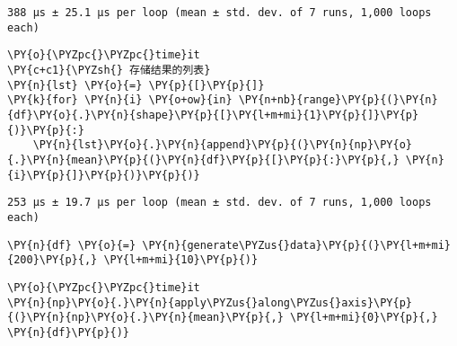     \begin{Verbatim}[commandchars=\\\{\}]
388 µs ± 25.1 µs per loop (mean ± std. dev. of 7 runs, 1,000 loops each)
    \end{Verbatim}

    \begin{tcolorbox}[breakable, size=fbox, boxrule=1pt, pad at break*=1mm,colback=cellbackground, colframe=cellborder]
\begin{Verbatim}[commandchars=\\\{\}]
\PY{o}{\PYZpc{}\PYZpc{}time}it
\PY{c+c1}{\PYZsh{} 存储结果的列表}
\PY{n}{lst} \PY{o}{=} \PY{p}{[}\PY{p}{]}
\PY{k}{for} \PY{n}{i} \PY{o+ow}{in} \PY{n+nb}{range}\PY{p}{(}\PY{n}{df}\PY{o}{.}\PY{n}{shape}\PY{p}{[}\PY{l+m+mi}{1}\PY{p}{]}\PY{p}{)}\PY{p}{:}
    \PY{n}{lst}\PY{o}{.}\PY{n}{append}\PY{p}{(}\PY{n}{np}\PY{o}{.}\PY{n}{mean}\PY{p}{(}\PY{n}{df}\PY{p}{[}\PY{p}{:}\PY{p}{,} \PY{n}{i}\PY{p}{]}\PY{p}{)}\PY{p}{)}
\end{Verbatim}
\end{tcolorbox}

    \begin{Verbatim}[commandchars=\\\{\}]
253 µs ± 19.7 µs per loop (mean ± std. dev. of 7 runs, 1,000 loops each)
    \end{Verbatim}

    \begin{tcolorbox}[breakable, size=fbox, boxrule=1pt, pad at break*=1mm,colback=cellbackground, colframe=cellborder]
\begin{Verbatim}[commandchars=\\\{\}]
\PY{n}{df} \PY{o}{=} \PY{n}{generate\PYZus{}data}\PY{p}{(}\PY{l+m+mi}{200}\PY{p}{,} \PY{l+m+mi}{10}\PY{p}{)}
\end{Verbatim}
\end{tcolorbox}

    \begin{tcolorbox}[breakable, size=fbox, boxrule=1pt, pad at break*=1mm,colback=cellbackground, colframe=cellborder]
\begin{Verbatim}[commandchars=\\\{\}]
\PY{o}{\PYZpc{}\PYZpc{}time}it
\PY{n}{np}\PY{o}{.}\PY{n}{apply\PYZus{}along\PYZus{}axis}\PY{p}{(}\PY{n}{np}\PY{o}{.}\PY{n}{mean}\PY{p}{,} \PY{l+m+mi}{0}\PY{p}{,} \PY{n}{df}\PY{p}{)}
\end{Verbatim}
\end{tcolorbox}

